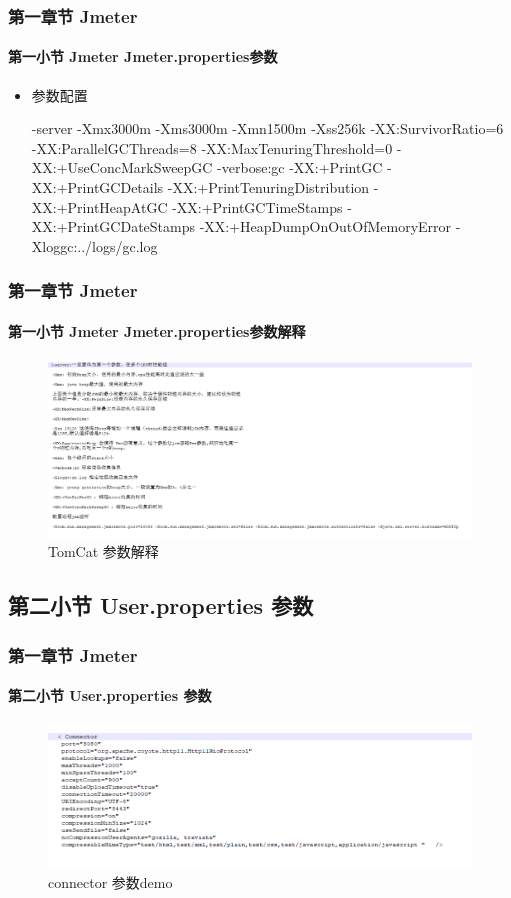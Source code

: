 \documentclass{beamer}
\begin{document}
\begin{frame}
    \frametitle{第一章节 Jmeter }
    \framesubtitle{第一小节 Jmeter Jmeter.properties参数}
     \begin{itemize}
    	\item 参数配置
    	 \small
    	 
    	 -server -Xmx3000m -Xms3000m -Xmn1500m -Xss256k -XX:SurvivorRatio=6 -XX:ParallelGCThreads=8 -XX:MaxTenuringThreshold=0 -XX:+UseConcMarkSweepGC -verbose:gc -XX:+PrintGC -XX:+PrintGCDetails -XX:+PrintTenuringDistribution -XX:+PrintHeapAtGC -XX:+PrintGCTimeStamps -XX:+PrintGCDateStamps -XX:+HeapDumpOnOutOfMemoryError -Xloggc:../logs/gc.log   	
    \end{itemize}
\end{frame}


\begin{frame}
\frametitle{第一章节 Jmeter }
\framesubtitle{第一小节 Jmeter Jmeter.properties参数解释}
\begin{figure}[ht]	
	\centering
	\includegraphics[scale=0.45]{img/shuoming.png}
	\caption{TomCat 参数解释}
	\label{fig:pathdemo1}
\end{figure}


\end{frame}



\subsection{第二小节 User.properties 参数 }

\begin{frame}
\frametitle{第一章节 Jmeter }
\framesubtitle{第二小节 User.properties  参数}
\begin{figure}[ht]	
	\centering
	\includegraphics[scale=0.48]{img/server.png}
	\caption{connector 参数demo}
	\label{fig:pathdemo1}
\end{figure}


\end{frame}
\end{document}
